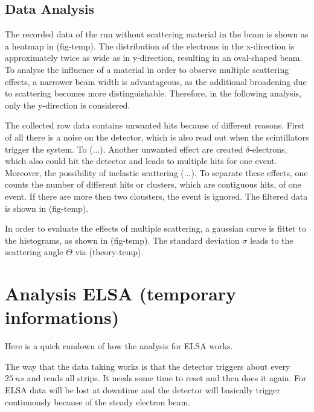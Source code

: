 \documentclass[sn-mathphys-num,iicol]{sn-jnl}
\theoremstyle{thmstyleone}
\theoremstyle{thmstyletwo}
\theoremstyle{thmstylethree}
\begin{document}
\subsection{Data Analysis}
The recorded data of the run without scattering material in the beam is shown as a heatmap in (fig-temp). The distribution of the electrons in the x-direction is approximately twice as wide as in y-direction, resulting in an oval-shaped beam.
To analyse the influence of a material in order to observe multiple scattering effects, a narrower beam width is advantageous, as the additional broadening due to scattering becomes more distinguishable. Therefore, in the following analysis, only the y-direction is considered.

The collected raw data contains unwanted hits because of different reasons. First of all there is a noise on the detector, which is also read out when the scintillators trigger the system. To (...).
Another unwanted effect are created $\delta$-electrons, which also could hit the detector and leads to multiple hits for one event. Moreover, the possibility of inelastic scattering (...). To separate these effects, one counts the number of different hits or clusters, which are contiguous hits, of one event. If there are more then two clousters, the event is ignored. The filtered data is shown in (fig-temp).

In order to evaluate the effects of multiple scattering, a gaussian curve is fittet to the histograms, as shown in (fig-temp). The standard deviation $\sigma$ leads to the scattering angle $\Theta$ via (theory-temp).




\clearpage
\section{Analysis ELSA (\textbf{temporary informations})}
Here is a quick rundown of how the analysis for ELSA works.

The way that the data taking works is that the detector triggers about every $\SI{25}{ns}$ and reads all strips.
It needs some time to reset and then does it again.
For ELSA data will be lost at downtime and the detector will basically trigger continuously because of the steady electron beam.
\end{document}
